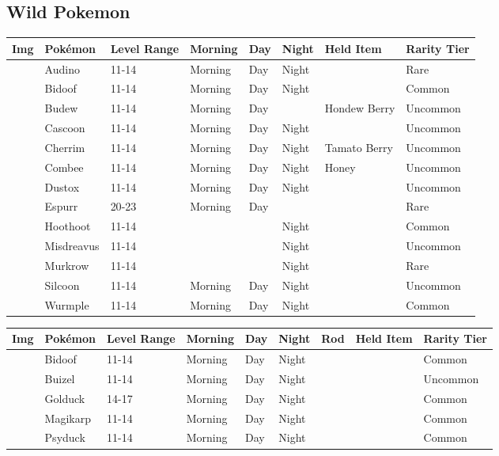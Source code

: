 \subsection{Wild Pokemon}%
\label{subsec:WildPokemon}%
\begin{longtable}{||l l l l l l l l||}%
\hline%
Img&Pokémon&Level Range&Morning&Day&Night&Held Item&Rarity Tier\\%
\hline%
\endhead%
\hline%
&Audino&11{-}14&Morning&Day&Night&&Rare\\%
\hline%
&Bidoof&11{-}14&Morning&Day&Night&&Common\\%
\hline%
&Budew&11{-}14&Morning&Day&&Hondew Berry&Uncommon\\%
\hline%
&Cascoon&11{-}14&Morning&Day&Night&&Uncommon\\%
\hline%
&Cherrim&11{-}14&Morning&Day&Night&Tamato Berry&Uncommon\\%
\hline%
&Combee&11{-}14&Morning&Day&Night&Honey&Uncommon\\%
\hline%
&Dustox&11{-}14&Morning&Day&Night&&Uncommon\\%
\hline%
&Espurr&20{-}23&Morning&Day&&&Rare\\%
\hline%
&Hoothoot&11{-}14&&&Night&&Common\\%
\hline%
&Misdreavus&11{-}14&&&Night&&Uncommon\\%
\hline%
&Murkrow&11{-}14&&&Night&&Rare\\%
\hline%
&Silcoon&11{-}14&Morning&Day&Night&&Uncommon\\%
\hline%
&Wurmple&11{-}14&Morning&Day&Night&&Common\\%
\hline%
\end{longtable}%
\begin{longtable}{||l l l l l l l l l||}%
\hline%
Img&Pokémon&Level Range&Morning&Day&Night&Rod&Held Item&Rarity Tier\\%
\hline%
\endhead%
\hline%
&Bidoof&11{-}14&Morning&Day&Night&&&Common\\%
\hline%
&Buizel&11{-}14&Morning&Day&Night&&&Uncommon\\%
\hline%
&Golduck&14{-}17&Morning&Day&Night&&&Common\\%
\hline%
&Magikarp&11{-}14&Morning&Day&Night&&&Common\\%
\hline%
&Psyduck&11{-}14&Morning&Day&Night&&&Common\\%
\hline%
\end{longtable}